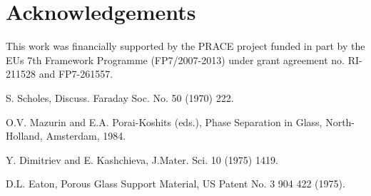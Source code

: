 \documentclass{prace}
\begin{document}
\section*{Acknowledgements}
This work was financially supported by the PRACE project funded in part
by the EUs 7th Framework Programme (FP7/2007-2013) under grant agreement
no. RI-211528 and FP7-261557. 

\begin{thebibliography}{99}

S. Scholes, Discuss. Faraday Soc. No. 50 (1970) 222.

O.V. Mazurin and E.A. Porai-Koshits (eds.), 
Phase Separation in Glass, North-Holland, Amsterdam, 1984.

Y. Dimitriev and E. Kashchieva, J.Mater. Sci. 10 (1975) 1419.

D.L. Eaton, Porous Glass Support Material, US Patent No. 3 904 422 (1975).

\end{thebibliography}

\end{document}

